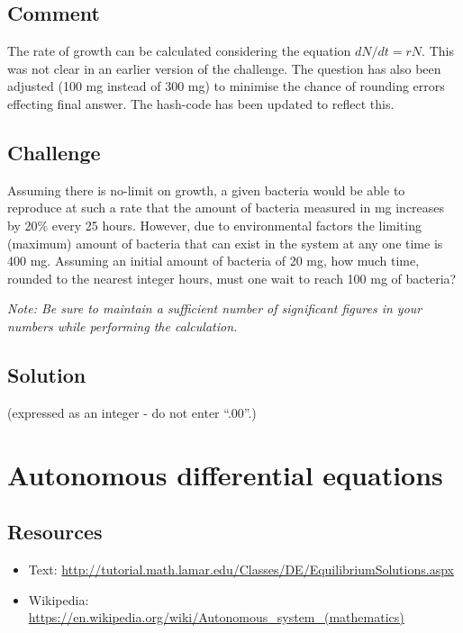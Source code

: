 \subsection*{Comment}
The rate of growth can be calculated considering the equation $dN/dt=rN$. This was not clear in an earlier version of the challenge. The question has also been adjusted (100 mg instead of 300 mg) to minimise the chance of rounding errors effecting final answer. The hash-code has been updated to reflect this.

\subsection*{Challenge}
Assuming there is no-limit on growth, a given bacteria would be able to reproduce at such a rate that the amount of bacteria measured in mg increases by 20\% every 25 hours. However, due to environmental factors the limiting (maximum) amount of bacteria that can exist in the system at any one time is 400 mg. Assuming an initial amount of bacteria of 20 mg, how much time, rounded to the nearest integer hours, must one wait to reach 100 mg of bacteria?

\emph{Note: Be sure to maintain a sufficient number of significant figures in your numbers while performing the calculation.}

\subsection*{Solution}
 (expressed as an integer - do not enter ``.00''.)


\timebox



\newpage
\section{Autonomous differential equations}

\subsection*{Resources}
\begin{itemize}
    \item Text: \url{http://tutorial.math.lamar.edu/Classes/DE/EquilibriumSolutions.aspx}
    \item Wikipedia: \url{https://en.wikipedia.org/wiki/Autonomous_system_(mathematics)}
\end{itemize}

